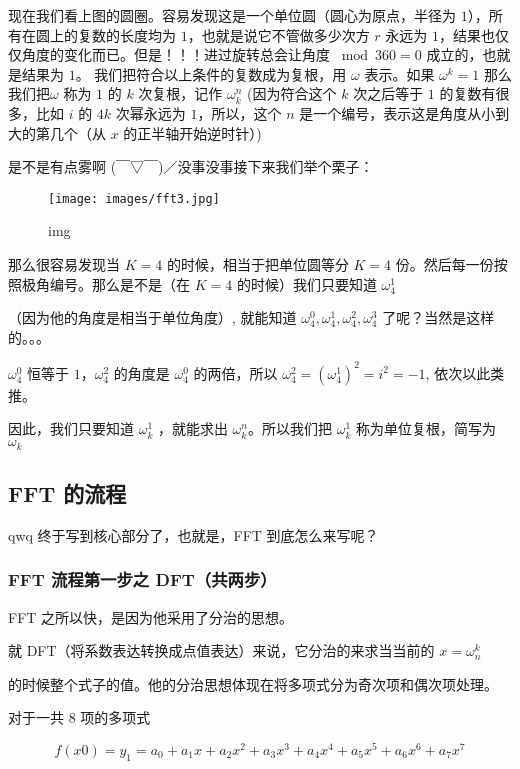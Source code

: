 现在我们看上图的圆圈。容易发现这是一个单位圆（圆心为原点，半径为 $1$），所有在圆上的复数的长度均为 $1$，也就是说它不管做多少次方 $r$ 永远为 $1$，结果也仅仅角度的变化而已。但是！！！进过旋转总会让角度 $\bmod 360 = 0$ 成立的，也就是结果为 $1$。 我们把符合以上条件的复数成为复根，用 $\omega$ 表示。如果 $\omega^k=1$ 那么我们把$\omega$ 称为 $1$ 的 $k$ 次复根，记作 $\omega_k^n$ (因为符合这个 $k$ 次之后等于 $1$ 的复数有很多，比如 $i$ 的 $4k$ 次幂永远为 $1$，所以，这个 $n$ 是一个编号，表示这是角度从小到大的第几个（从 $x$ 的正半轴开始逆时针）)

是不是有点雾啊 (￣▽￣)／没事没事接下来我们举个栗子：

\begin{figure}[h]
\centering
\texttt{[image: images/fft3.jpg]} 
\caption{img}
\end{figure}

那么很容易发现当 $K = 4$ 的时候，相当于把单位圆等分 $K= 4$ 份。然后每一份按照极角编号。那么是不是（在 $K = 4$ 的时候）我们只要知道 $\omega_4^1$

（因为他的角度是相当于单位角度）, 就能知道 $\omega_4^0, \omega_4^1, \omega_4^2, \omega_4^3$ 了呢？当然是这样的。。。

$\omega_4^0$ 恒等于 $1$，$\omega_4^2$ 的角度是 $\omega_4^0$ 的两倍，所以 $\omega_4^2 = (\omega_4^1)^2 = i^2=-1$, 依次以此类推。

因此，我们只要知道 $\omega_k^1$ ，就能求出 $\omega_k^n$。所以我们把 $\omega_k^1$ 称为单位复根，简写为 $\omega_k$

\subsection{FFT 的流程}

qwq 终于写到核心部分了，也就是，FFT 到底怎么来写呢？

\subsubsection{FFT 流程第一步之 DFT（共两步）}

FFT 之所以快，是因为他采用了分治的思想。

就 DFT（将系数表达转换成点值表达）来说，它分治的来求当当前的 $x=\omega_n^k$

的时候整个式子的值。他的分治思想体现在将多项式分为奇次项和偶次项处理。

对于一共 $8$ 项的多项式

$$
f(x0) = y_1 = a_0 + a_1x + a_2x^2+a_3x^3+a_4x^4+a_5x^5+a_6x^6+a_7x^7
$$


